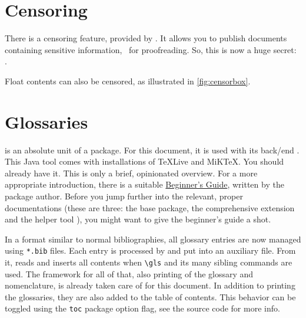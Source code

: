 \section{Censoring}

There is a censoring feature, provided by .
It allows you to publish documents containing sensitive information, \ for
proofreading.
So, this is now a huge
secret:
.

Float contents can also be censored, as illustrated in \cref{fig:censorbox}.
\begin{figure}
\end{figure}

\section{Glossaries}
\label{ch:glossaries}

 is an absolute unit of a package.
For this document, it is used with its back\-/end .
This Java tool comes with installations of TeXLive and MiKTeX.
You should already have it.
This  is only a brief, opinionated overview.
For a more appropriate introduction, there is a suitable
\href{http://tug.ctan.org/macros/latex/contrib/glossaries/glossariesbegin.pdf}{Beginner's Guide},
written by the package author.
Before you jump further into the relevant, proper documentations (these are three: the
 base package, the comprehensive extension
 and the helper tool ), you might
want to give the beginner's guide a shot.

In a format similar to normal bibliographies, all glossary entries are now managed
using \texttt{*.bib} files.
Each entry is processed by  and put into an auxiliary file.
From it,  reads and inserts all contents when \verb|\gls|
and its many sibling commands are used.
The framework for all of that, also printing of the glossary and nomenclature,
is already taken care of for this document.
In addition to printing the glossaries, they are also added to the table of contents.
This behavior can be toggled using the \texttt{toc} package option flag,
see the source code for more info.


